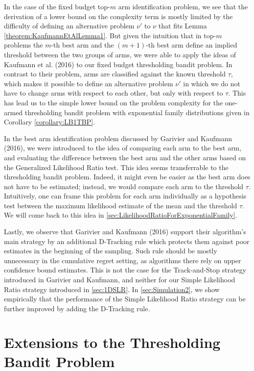 \documentclass[11pt,]{article}
\begin{document}
In the case of the fixed budget top-\(m\) arm identification problem, we
see that the derivation of a lower bound on the complexity term is
mostly limited by the difficulty of defining an alternative problem
\(\nu'\) to \(\nu\) that fits Lemma \ref{theorem:KaufmannEtAlLemma1}.
But given the intuition that in top-\(m\) problems the \(m\)-th best arm
and the \((m+1)\)-th best arm define an implied threshold between the
two groups of arms, we were able to apply the ideas of Kaufmann et al.
(2016) to our fixed budget thresholding bandit problem. In contrast to
their problem, arms are classified against the known threshold \(\tau\),
which makes it possible to define an alternative problem \(\nu'\) in
which we do not have to change arms with respect to each other, but only
with respect to \(\tau\). This has lead us to the simple lower bound on
the problem complexity for the one-armed thresholding bandit problem
with exponential family distributions given in Corollary
\ref{corollary:LB1TBP}.

In the best arm identification problem discussed by Garivier and
Kaufmann (2016), we were introduced to the idea of comparing each arm to
the best arm, and evaluating the difference between the best arm and the
other arms based on the Generalized Likelihood Ratio test. This idea
seems transferrable to the thresholding bandit problem. Indeed, it might
even be easier as the best arm does not have to be estimated; instead,
we would compare each arm to the threshold \(\tau\). Intuitively, one
can frame this problem for each arm individually as a hypothesis test
between the maximum likelihood estimate of the mean and the threshold
\(\tau\). We will come back to this idea in
\autoref{sec:LikelihoodRatioForExponentialFamily}.

Lastly, we observe that Garivier and Kaufmann (2016) support their
algorithm's main strategy by an additional D-Tracking rule which
protects them against poor estimates in the beginning of the sampling.
Such rule should be mostly unnecessary in the cumulative regret setting,
as algorithms there rely on upper confidence bound estimates. This is
not the case for the Track-and-Stop strategy introduced in Garivier and
Kaufmann, and neither for our Simple Likelihood Ratio strategy
introduced in \autoref{sec:1DSLR}. In \autoref{sec:Simulation2}, we show
empirically that the performance of the Simple Likelihood Ratio strategy
can be further improved by adding the D-Tracking rule.

\newpage

\section{\texorpdfstring{Extensions to the Thresholding Bandit Problem
\label{chap:Extensions}}{Extensions to the Thresholding Bandit Problem }}\label{extensions-to-the-thresholding-bandit-problem}
\end{document}
